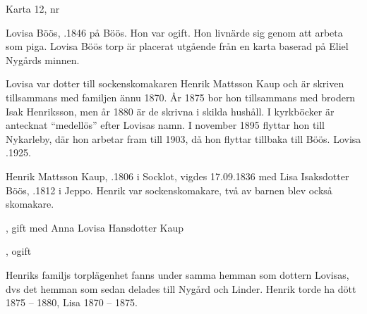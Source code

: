 Karta 12,   nr 

%
Lovisa Böös, .1846 på Böös. Hon var ogift. Hon livnärde sig genom att arbeta som piga. Lovisa Böös torp är placerat utgående från en karta baserad på Eliel Nygårds minnen.

Lovisa var dotter till sockenskomakaren Henrik Mattsson Kaup och är skriven tillsammans med familjen ännu 1870. År 1875 bor hon tillsammans med brodern Isak Henriksson, men år 1880 är de skrivna i skilda hushåll. I kyrkböcker är antecknat ``medellös'' efter Lovisas namn. I november 1895 flyttar hon till Nykarleby, där hon arbetar fram till 1903, då hon flyttar tillbaka till Böös. Lovisa .1925.


%
Henrik Mattsson Kaup, .1806 i Socklot, vigdes 17.09.1836 med Lisa Isaksdotter Böös, .1812 i Jeppo. Henrik var sockenskomakare, två av barnen blev också skomakare.
\begin{jhchildren}
  \item {}
  \item {}
  \item {}, gift med Anna Lovisa Hansdotter Kaup
  \item {}, ogift
  \item {}
  \item {}
  \item {}
  \item {}
\end{jhchildren}
Henriks familjs torplägenhet fanns under samma hemman som dottern Lovisas, dvs det hemman som sedan delades till Nygård och Linder. Henrik torde ha dött 1875 – 1880, Lisa 1870 – 1875.


